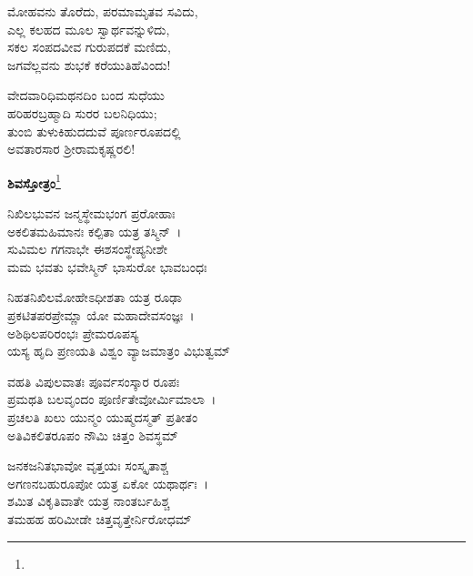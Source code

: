\begin{myquote}
ಮೋಹವನು ತೊರೆದು, ಪರಮಾಮೃತವ ಸವಿದು,\\ಎಲ್ಲ ಕಲಹದ ಮೂಲ ಸ್ವಾರ್ಥವನ್ನುಳಿದು,\\ಸಕಲ ಸಂಪದವೀವ ಗುರುಪದಕೆ ಮಣಿದು,\\ಜಗವೆಲ್ಲವನು ಶುಭಕೆ ಕರೆಯುತಿಹೆವಿಂದು!
\end{myquote}

\begin{myquote}
ವೇದವಾರಿಧಿಮಥನದಿಂ ಬಂದ ಸುಧೆಯು\\ಹರಿಹರಬ್ರಹ್ಮಾದಿ ಸುರರ ಬಲನಿಧಿಯು;\\ತುಂಬಿ ತುಳುಕಿಹುದದುವೆ ಪೂರ್ಣರೂಪದಲ್ಲಿ\\ಅವತಾರಸಾರ ಶ‍್ರೀರಾಮಕೃಷ್ಣರಲಿ!
\end{myquote}

\begin{center}
\textbf{ಶಿವಸ್ತೋತ್ರಂ}\footnote{}
\end{center}

\begin{myquote}
ನಿಖಿಲಭುವನ ಜನ್ಮಸ್ಥೇಮಭಂಗ ಪ್ರರೋಹಾಃ\\ಅಕಲಿತಮಹಿಮಾನಃ ಕಲ್ಪಿತಾ ಯತ್ರ ತಸ್ಮಿನ್~।\\ಸುವಿಮಲ ಗಗನಾಭೇ ಈಶಸಂಸ್ಥೇಪ್ಯನೀಶೇ\\ಮಮ ಭವತು ಭವೇಸ್ಮಿನ್ ಭಾಸುರೋ ಭಾವಬಂಧಃ
\end{myquote}


\begin{myquote}
ನಿಹತನಿಖಿಲಮೋಹೇಽಧೀಶತಾ ಯತ್ರ ರೂಢಾ\\ಪ್ರಕಟಿತಪರಪ್ರೇಮ್ಣಾ ಯೋ ಮಹಾದೇವಸಂಜ್ಞಃ~।\\ಅಶಿಥಿಲಪರಿರಂಭಃ ಪ್ರೇಮರೂಪಸ್ಯ\\ಯಸ್ಯ ಹೃದಿ ಪ್ರಣಯತಿ ವಿಶ್ವಂ ವ್ಯಾಜಮಾತ್ರಂ ವಿಭುತ್ವಮ್
\end{myquote}


\begin{myquote}
ವಹತಿ ವಿಪುಲವಾತಃ ಪೂರ್ವಸಂಸ್ಕಾರ ರೂಪಃ\\ಪ್ರಮಥತಿ ಬಲವೃಂದಂ ಪೂರ್ಣಿತೇವೋರ್ಮಿಮಾಲಾ~।\\ಪ್ರಚಲತಿ ಖಲು ಯುನ್ಮಂ ಯುಷ್ಮದಸ್ಮತ್ ಪ್ರತೀತಂ\\ಅತಿವಿಕಲಿತರೂಪಂ ನೌಮಿ ಚಿತ್ತಂ ಶಿವಸ್ಥಮ್
\end{myquote}


\begin{myquote}
ಜನಕಜನಿತಭಾವೋ ವೃತ್ತಯಃ ಸಂಸ್ಕೃತಾಶ್ಚ\\ಅಗಣನಬಹುರೂಪೋ ಯತ್ರ ಏಕೋ ಯಥಾರ್ಥಃ~।\\ಶಮಿತ ವಿಕೃತಿವಾತೇ ಯತ್ರ ನಾಂತರ್ಬಹಿಶ್ಚ\\ತಮಹಹ ಹರಿಮೀಡೇ ಚಿತ್ತವೃತ್ತೇರ್ನಿರೋಧಮ್
\end{myquote}

